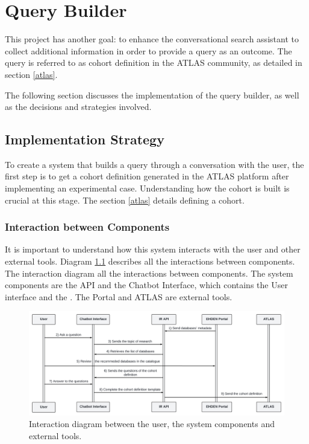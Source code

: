 \chapter{Query Builder}
\label{chapter:QueryBuilder}

This project has another goal: to enhance the conversational search assistant to collect additional information in order to provide a query as an outcome. The query is referred to as cohort definition in the ATLAS community, as detailed in section \ref{atlas}.

The following section discusses the implementation of the query builder, as well as the decisions and strategies involved.


\section{Implementation Strategy}


To create a system that builds a query through a conversation with the user, the first step is to get a cohort definition generated in the ATLAS platform after implementing an experimental case. Understanding how the cohort is built is crucial at this stage. The section \ref{atlas} details defining a cohort.


\subsection{Interaction between Components}

It is important to understand how this system interacts with the user and other external tools. Diagram \ref{fig_interaction} describes all the interactions between components. The interaction diagram all the interactions between components. The system components are the {\ir} API and the Chatbot Interface, which contains the User interface and the {\llm}. The {\ehden} Portal and ATLAS are external tools.

\begin{figure}[H]
  \includegraphics[width=\textwidth]{figs/chapter4/interaction_diagram.png}
  \centering
  \caption{Interaction diagram between the user, the system components and external tools.}
  \label{fig_interaction}
\end{figure}

